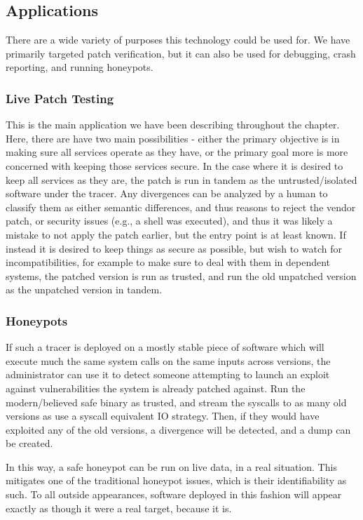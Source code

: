 \subsection{Applications}
\label{tach:sec:apps}
There are a wide variety of purposes this technology could be used for. We
have primarily targeted patch verification, but it can also be used for
debugging, crash reporting, and running honeypots.
\subsubsection{Live Patch Testing}
This is the main application we have been describing throughout the chapter.
Here, there are have two main possibilities - either the primary
objective is in making sure all services operate as they have,
or the primary goal more is more concerned with keeping those services secure.
In the case where it is desired to keep all services as they are,
the patch is run in tandem as the untrusted/isolated software under the
tracer. Any divergences can be analyzed by a human to classify them
as either semantic differences, and thus reasons to reject the
vendor patch, or security issues (e.g., a shell was executed),
and thus it was likely a mistake to not apply the patch earlier, but
the entry point is at least known.
If instead it is desired to keep things as secure as possible, but wish
to watch for incompatibilities, for example to make sure to deal with them
in dependent systems, the patched version is run as trusted, and run
the old unpatched version as the unpatched version in tandem.
\subsubsection{Honeypots}
\label{tach:sec:honeypot}
If such a tracer is deployed on a mostly stable piece of software
which will execute much the same system calls on the same inputs across
versions, the administrator can use it to detect someone attempting to launch an
exploit against vulnerabilities the system is already patched against. Run the
modern/believed safe binary as trusted, and stream the syscalls to
as many old versions as use a syscall equivalent IO strategy. Then,
if they would have exploited any of the old versions, a divergence will
be detected, and a dump can be created.

In this way, a safe honeypot can be run on live data, in a real
situation. This mitigates one of the traditional honeypot issues, which
is their identifiability as such. To all outside appearances, software
deployed in this fashion will appear exactly as though it were a real
target, because it is.

